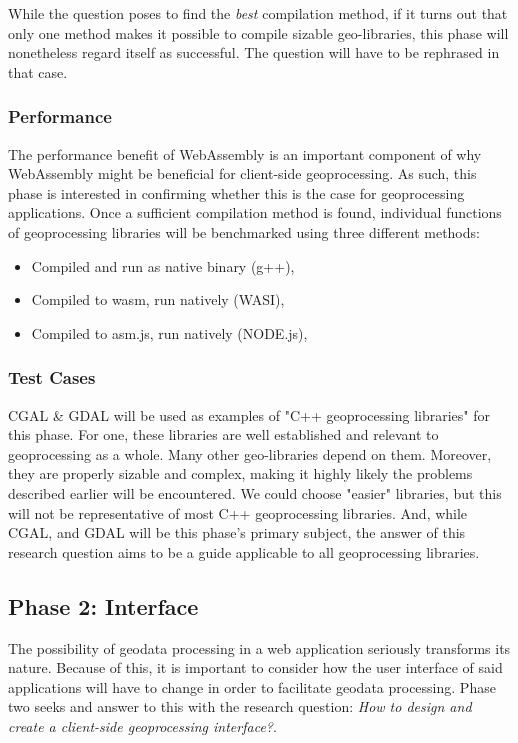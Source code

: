 While the question poses to find the \textit{best} compilation method, if it turns out that only one method makes it possible to compile sizable geo-libraries, this phase will nonetheless regard itself as successful. The question will have to be rephrased in that case. 

\subsubsection*{Performance}
The performance benefit of WebAssembly is an important component of why WebAssembly might be beneficial for client-side geoprocessing. As such, this phase is interested in confirming whether this is the case for geoprocessing applications. Once a sufficient compilation method is found, individual functions of geoprocessing libraries will be benchmarked using three different methods: 

\begin{itemize}
    \item Compiled and run as native binary (g++), 
    \item Compiled to wasm, run natively (WASI),
    \item Compiled to asm.js, run natively (NODE.js),
\end{itemize}

\subsubsection*{Test Cases}
CGAL \& GDAL will be used as examples of "C++ geoprocessing libraries" for this phase. For one, these libraries are well established and relevant to geoprocessing as a whole. Many other geo-libraries depend on them. Moreover, they are properly sizable and complex, making it highly likely the problems described earlier will be encountered. We could choose "easier" libraries, but this will not be representative of most C++ geoprocessing libraries. And, while CGAL, and GDAL will be this phase's primary subject, the answer of this research question aims to be a guide applicable to all geoprocessing libraries. 


\subsection{Phase 2: Interface}

The possibility of geodata processing in a web application seriously transforms its nature. Because of this, it is important to consider how the user interface of said applications will have to change in order to facilitate geodata processing. 
Phase two seeks and answer to this with the research question: \textit{How to design and create a client-side geoprocessing interface?}. 

